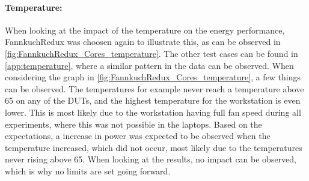 


\paragraph{Temperature:} When looking at the impact of the temperature on the energy performance, FannkuchRedux was choosen again to illustrate this, as can be observed in \cref*{fig:FannkuchRedux_Cores_temperature}. The other test cases can be found in \cref{app:temperature}, where a similar pattern in the data can be observed. When considering the graph in \cref{fig:FannkuchRedux_Cores_temperature}, a few things can be observed. The temperatures for example never reach a temperature above 65 on any of the DUTs, and the highest temperature for the workstation is even lower. This is most likely due to the workstation having full fan speed during all experiments, where this was not possible in the laptops. Based on the expectations, a increase in power was expected to be observed when the temperature increased, which did not occur, most likely due to the temperatures never rising above 65. When looking at the results, no impact can be observed, which is why no limits are set going forward.





